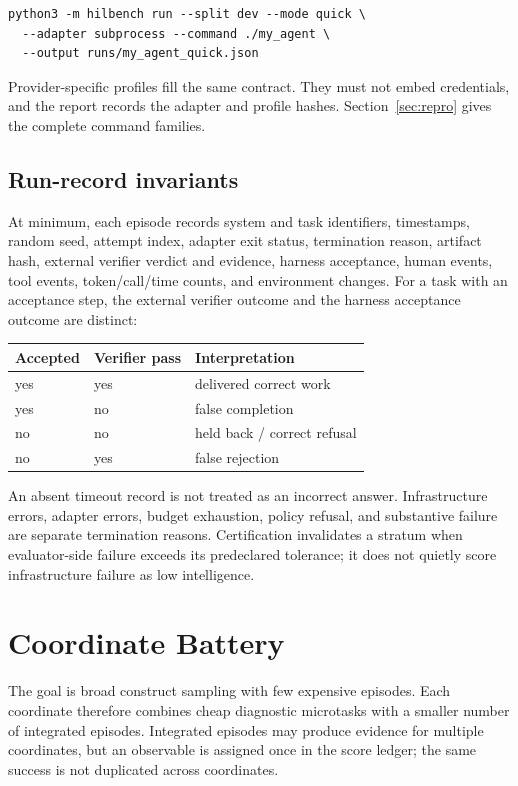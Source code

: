 \documentclass[11pt]{article}
\theoremstyle{definition}
\begin{document}
\begin{verbatim}
python3 -m hilbench run --split dev --mode quick \
  --adapter subprocess --command ./my_agent \
  --output runs/my_agent_quick.json
\end{verbatim}

Provider-specific profiles fill the same contract. They must not embed credentials, and the report records the adapter and profile hashes. Section~\ref{sec:repro} gives the complete command families.

\subsection{Run-record invariants}

At minimum, each episode records system and task identifiers, timestamps, random seed, attempt index, adapter exit status, termination reason, artifact hash, external verifier verdict and evidence, harness acceptance, human events, tool events, token/call/time counts, and environment changes. For a task with an acceptance step, the external verifier outcome and the harness acceptance outcome are distinct:

\begin{center}
\begin{tabular}{lll}
\toprule
Accepted & Verifier pass & Interpretation \\
\midrule
yes & yes & delivered correct work \\
yes & no & false completion \\
no & no & held back / correct refusal \\
no & yes & false rejection \\
\bottomrule
\end{tabular}
\end{center}

An absent timeout record is not treated as an incorrect answer. Infrastructure errors, adapter errors, budget exhaustion, policy refusal, and substantive failure are separate termination reasons. Certification invalidates a stratum when evaluator-side failure exceeds its predeclared tolerance; it does not quietly score infrastructure failure as low intelligence.

\section{Coordinate Battery}\label{sec:battery}

The goal is broad construct sampling with few expensive episodes. Each coordinate therefore combines cheap diagnostic microtasks with a smaller number of integrated episodes. Integrated episodes may produce evidence for multiple coordinates, but an observable is assigned once in the score ledger; the same success is not duplicated across coordinates.
\end{document}
